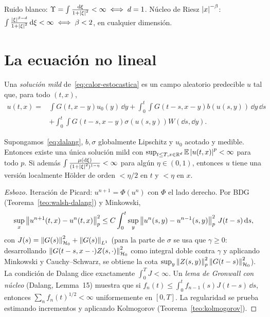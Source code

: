 \begin{ejemplo}
Ruido blanco: $\Upsilon=\int\frac{\mathrm{d}\xi}{1+\left\lvert \xi\right\rvert^2}<\infty\iff d=1$. Núcleo de Riesz $\left\lvert x\right\rvert^{-\beta}$:
$\int\frac{\left\lvert \xi\right\rvert^{\beta-d}}{1+\left\lvert \xi\right\rvert^2}\,\mathrm{d}\xi<\infty\iff\beta<2$, en cualquier dimensión.
\end{ejemplo}

\section{La ecuación no lineal}

\begin{definicion}
Una \emph{solución mild} de~\eqref{eq:calor-estocastica} es un campo aleatorio predecible $u$ tal que,
para todo $(t,x)$,
\begin{align*}
  u(t,x)={}&\int G(t,x-y)u_0(y)\,\dd y+\int_0^t\!\!\int G(t-s,x-y)b(u(s,y))\,\dd y\,\dd s\\
  &+\int_0^t\!\!\int G(t-s,x-y)\sigma(u(s,y))W(\dd s,\dd y).
\end{align*}
\end{definicion}

\begin{teorema}\label{teo:existencia-edpe}
Supongamos~\eqref{eq:dalang}, $b,\sigma$ globalmente Lipschitz y $u_0$ acotado
y medible. Entonces existe una única solución mild con $\sup_{t\le T,x\in\mathbb{R}^d}\mathbb{E}\left\lvert u(t,x)\right\rvert^p<\infty$ para
todo $p$. Si además $\int\frac{\mu(\mathrm{d}\xi)}{(1+\left\lvert \xi\right\rvert^2)^{1-\eta}}<\infty$ para algún $\eta\in(0,1)$, entonces $u$ tiene una versión
localmente Hölder de orden $<\eta/2$ en $t$ y $<\eta$ en $x$.
\end{teorema}

\begin{proof}[Esbozo]
Iteración de Picard: $u^{n+1}=\Phi(u^n)$ con $\Phi$ el lado derecho. Por BDG (Teorema~\ref{teo:walsh-dalang}) y
Minkowski,
\[
  \sup_x\left\lVert u^{n+1}(t,x)-u^n(t,x)\right\rVert_p^2\le C\int_0^t\sup_y\left\lVert u^n(s,y)-u^{n-1}(s,y)\right\rVert_p^2\,J(t-s)\,\mathrm{d} s,
\]
con $J(s)=\left\lVert G(s)\right\rVert^2_{\mathcal{H}_0}+\left\lVert G(s)\right\rVert_{L^1}$ (para la parte de $\sigma$ se usa que $\gamma\ge0$: desarrollando
$\left\lVert G(t-s,x-\cdot)Z(s,\cdot)\right\rVert^2_{\mathcal{H}_0}$ como integral doble contra $\gamma$ y aplicando Minkowski y Cauchy--Schwarz,
se obtiene la cota $\sup_y\left\lVert Z(s,y)\right\rVert_p^2\left\lVert G(t-s)\right\rVert^2_{\mathcal{H}_0}$). La condición de Dalang dice exactamente
$\int_0^TJ<\infty$. Un \emph{lema de Gronwall con núcleo} (Dalang, Lemma~15) muestra que si
$f_n(t)\le\int_0^tf_{n-1}(s)J(t-s)\,\dd s$, entonces $\sum_nf_n(t)^{1/2}<\infty$ uniformemente en $[0,T]$. La regularidad
se prueba estimando incrementos y aplicando Kolmogorov (Teorema~\ref{teo:kolmogorov}).
\end{proof}

